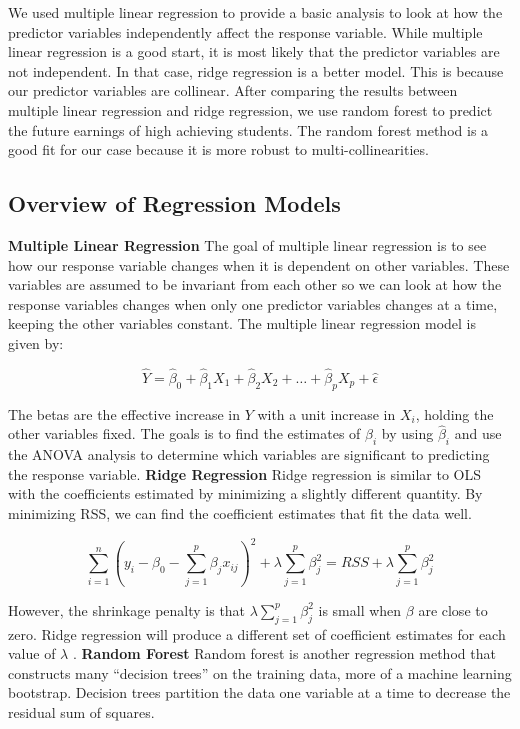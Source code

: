 \documentclass{article}
\begin{document}
  We used multiple linear regression to provide a basic analysis to look at how the predictor variables independently affect the response variable.  
While multiple linear regression is a good start, it is most likely that the predictor variables are not independent.  In that case, ridge regression is a better model.  This is because our predictor variables are collinear.  
After comparing the results between multiple linear regression and ridge regression, we use random forest to predict the future earnings of high achieving students.  The random forest method is a good fit for our case because it is more robust to multi-collinearities. 


\subsection{Overview of Regression Models}

\noindent \textbf{Multiple Linear Regression} \newline
\indent The goal of multiple linear regression is to see how our response variable changes when it is dependent on other variables.  These variables are assumed to be invariant from each other so we can look at how the response variables changes when only one predictor variables changes at a time, keeping the other variables constant.  The multiple linear regression model is given by:

$$\hat Y = \hat \beta_0 + \hat \beta_1 X_1 + \hat \beta_2 X_2 + \dots + \hat \beta_p X_p + \hat \epsilon$$

The betas are the effective increase in $Y$ with a unit increase in $X_i$, holding the other variables fixed.  
The goals is to find the estimates of $\beta_i$ by using $\hat \beta_i$ and use the ANOVA analysis to determine which variables are significant to predicting the response variable.
\newline
\newline
\textbf{Ridge Regression}\newline
\indent Ridge regression is similar to OLS with the coefficients estimated by minimizing a slightly different quantity.  By minimizing RSS, we can find the coefficient estimates that fit the data well. 

$$\sum_{i=1}^{n}(y_i-\beta_0-\sum_{j=1}^{p}\beta_jx_{ij})^2+\lambda\sum_{j=1}^{p}\beta_j^2 = RSS + \lambda\sum_{j=1}^{p}\beta_j^{2}$$ 

However, the shrinkage penalty is that $\lambda\sum_{j=1}^{p}\beta_j^{2}$ is small when $\beta$ are close to zero. Ridge regression will produce a different set of coefficient estimates for each value of $\lambda$ .
\newline
\newline
\textbf{Random Forest}\newline
\indent Random forest is another regression method that constructs many ``decision trees'' on the training data, more of a machine learning bootstrap.  Decision trees partition the data one variable at a time to decrease the residual sum of squares. 
\end{document}
